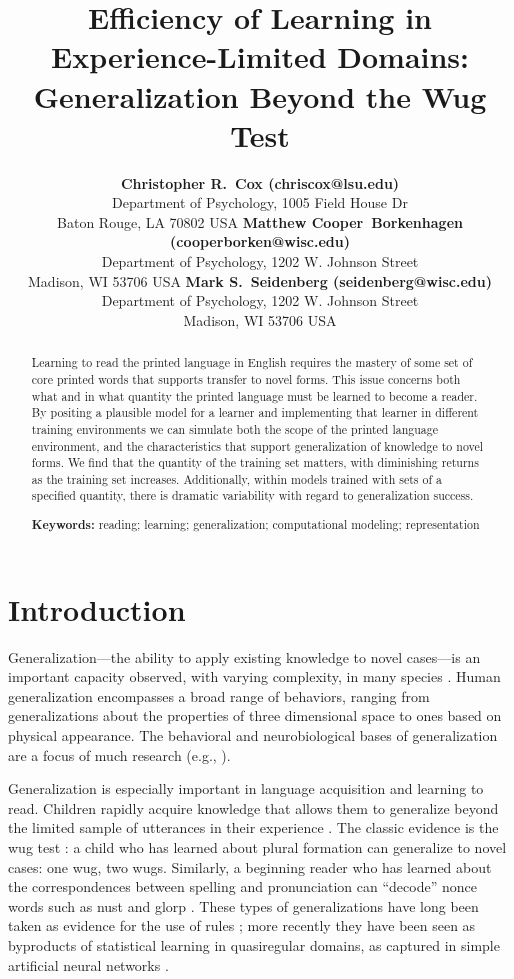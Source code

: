 \documentclass[10pt,letterpaper]{article}
\title{Efficiency of Learning in Experience-Limited Domains: Generalization Beyond the Wug Test}
\author{%
	{\large \bf Christopher R.~Cox (chriscox@lsu.edu)} \\
  	Department of Psychology, 1005 Field House Dr \\
  	Baton Rouge, LA 70802 USA
  \AND%
	{\large \bf Matthew Cooper~Borkenhagen (cooperborken@wisc.edu)} \\
	Department of Psychology, 1202 W. Johnson Street \\
	Madison, WI 53706 USA
  \AND%
	{\large \bf Mark S.~Seidenberg (seidenberg@wisc.edu)} \\
	Department of Psychology, 1202 W. Johnson Street \\
	Madison, WI 53706 USA
}
\begin{document}
\maketitle


\begin{abstract}
Learning to read the printed language in English requires the mastery of some set of core printed words that supports transfer to novel forms. This issue concerns both what and in what quantity the printed language must be learned to become a reader. By positing a plausible model for a learner and implementing that learner in different training environments we can simulate both the scope of the printed language environment, and the characteristics that support generalization of knowledge to novel forms. We find that the quantity of the training set matters, with diminishing returns as the training set increases. Additionally, within models trained with sets of a specified quantity, there is dramatic variability with regard to generalization success.

\textbf{Keywords:} 
reading; learning; generalization; computational modeling; representation
\end{abstract}


\section{Introduction}

Generalization—the ability to apply existing knowledge to novel cases—is an important capacity observed, with varying complexity, in many species \cite{Santolin2018}. Human generalization encompasses a broad range of behaviors, ranging from generalizations about the properties of three dimensional space to ones based on physical appearance.  The behavioral and neurobiological bases of generalization are a focus of much research (e.g., \cite{Goldberg2009,Onat2015,Zhang2016}).

Generalization is especially important in language acquisition and learning to read. Children rapidly acquire knowledge that allows them to generalize beyond the limited sample of utterances in their experience \cite{Chomsky1965}. The classic evidence is the wug test \cite{Berko1958}: a child who has learned about plural formation can generalize to novel cases:  one wug, two wugs.  Similarly, a beginning reader who has learned about the correspondences between spelling and pronunciation can ``decode'' nonce words such as nust and glorp \cite{Seidenberg1989}.  These types of generalizations have long been taken as evidence for the use of rules \cite{Pinker1991}; more recently they have been seen as byproducts of statistical learning in quasiregular domains, as captured in simple artificial neural networks \cite{Seidenberg2014}.
\end{document}
